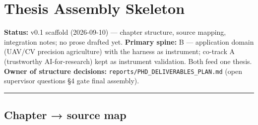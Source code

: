 \documentclass[11pt]{article}
\begin{document}
\section{Thesis Assembly Skeleton}\label{thesis-assembly-skeleton}

\textbf{Status:} v0.1 scaffold (2026-09-10) --- chapter structure,
source mapping, integration notes; no prose drafted yet. \textbf{Primary
spine:} B --- application domain (UAV/CV precision agriculture) with the
harness as instrument; co-track A (trustworthy AI-for-research) kept as
instrument validation. Both feed one thesis. \textbf{Owner of structure
decisions:} \texttt{reports/PHD\_DELIVERABLES\_PLAN.md} (open supervisor
questions §4 gate final assembly).

\begin{center}\rule{0.5\linewidth}{0.5pt}\end{center}

\subsection{Chapter → source map}\label{chapter-source-map}
\end{document}
